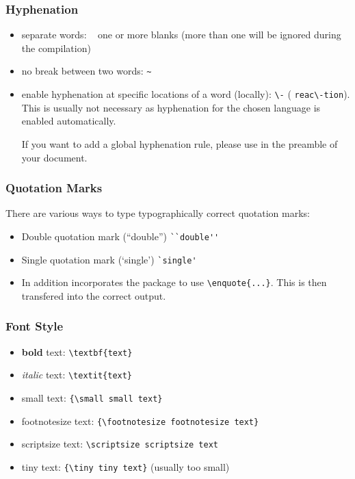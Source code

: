 \subsubsection{Hyphenation}
\begin{itemize}
\item separate words: \verb| | one or more blanks (more than one will be
      ignored during the compilation)
\item no break between two words: \verb|~|
\item enable hyphenation at specific locations of a word (locally): \verb|\-| (\eg
      \verb|reac\-tion|). This is usually not necessary as hyphenation for the chosen language is
      enabled automatically.

      If you want to add a global hyphenation rule, please use  in the preamble of your document.
\end{itemize}

\subsubsection{Quotation Marks}
There are various ways to type typographically correct quotation marks:
\begin{itemize}
\item Double quotation mark (``double'') \verb|``double''|
\item Single quotation mark (`single') \verb|`single'|
   \item In addition \PharmRep incorporates the  package to use
      \verb|\enquote{...}|. This is then transfered into the correct output.
\end{itemize}

\subsubsection{Font Style}
\begin{itemize}
\item \textbf{bold} text: \verb|\textbf{text}|
\item \textit{italic} text: \verb|\textit{text}|
\item {\small small text}: \verb|{\small small text}|
\item {\footnotesize footnotesize text}: \verb|{\footnotesize footnotesize text}|
\item {\scriptsize scriptsize text}: \verb|\scriptsize scriptsize text|
   \item {\tiny tiny text}: \verb|{\tiny tiny text}| (usually too small)
\end{itemize}

